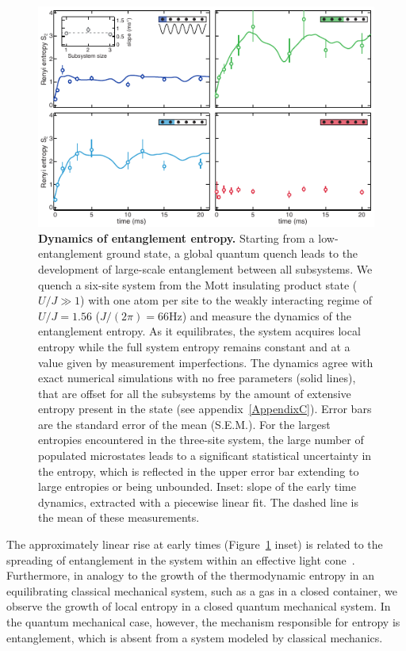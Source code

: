 \begin{figure}[t!]
	\centering
	\includegraphics[scale=1.5]{figures/ETH_EE_dynamics.pdf}
	\caption{{\bf Dynamics of entanglement entropy. } Starting from a low-entanglement ground state, a global quantum quench leads to the development of large-scale entanglement between all subsystems. We quench a six-site system from the Mott insulating product state ($U/J\gg 1$) with one atom per site to the weakly interacting regime of $U/J=1.56$ ($J/(2\pi) = 66\mathrm{Hz}$) and measure the dynamics of the entanglement entropy. As it equilibrates, the system acquires local entropy while the full system entropy remains constant and at a value given by measurement imperfections. The dynamics agree with exact numerical simulations with no free parameters (solid lines), that are offset for all the subsystems by the amount of extensive entropy present in the state (see appendix~\ref{AppendixC}). Error bars are the standard error of the mean (S.E.M.). For the largest entropies encountered in the three-site system, the large number of populated microstates leads to a significant statistical uncertainty in the entropy, which is reflected in the upper error bar extending to large entropies or being unbounded. Inset: slope of the early time dynamics, extracted with a piecewise linear fit. The dashed line is the mean of these measurements.}
	\label{fig:EEDyn}
\end{figure} 

The approximately linear rise at early times (Figure~\ref{fig:EEDyn} inset) is related to the spreading of entanglement in the system within an effective light cone~\cite{Calabrese2005,Cheneau2012,Richerme2014}. Furthermore, in analogy to the growth of the thermodynamic entropy in an equilibrating classical mechanical system, such as a gas in a closed container, we observe the growth of local entropy in a closed quantum mechanical system. In the quantum mechanical case, however, the mechanism responsible for entropy is entanglement, which is absent from a system modeled by classical mechanics.


